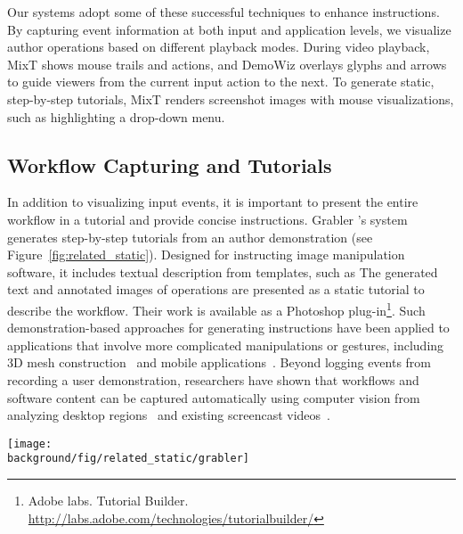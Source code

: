 Our systems adopt some of these successful techniques to enhance instructions. By capturing event information at both input and application levels, we visualize author operations based on different playback modes.
%
During video playback, MixT shows mouse trails and actions, and DemoWiz overlays glyphs and arrows to guide viewers from the current input action to the next.
%
To generate static, step-by-step tutorials, MixT renders screenshot images with mouse visualizations, such as highlighting a drop-down menu.


\subsection{Workflow Capturing and Tutorials}
In addition to visualizing input events, it is important to present the entire workflow in a tutorial and provide concise instructions.
%
Grabler \ea{}'s system~\cite{Grabler:2009jj} generates step-by-step tutorials from an author demonstration (see Figure~\ref{fig:related_static}). Designed for instructing image manipulation software, it includes textual description from templates, such as  The generated text and annotated images of operations are presented as a static tutorial to describe the workflow. Their work is available as a Photoshop plug-in\footnote{Adobe labs. Tutorial Builder. \url{http://labs.adobe.com/technologies/tutorialbuilder/}}.
%
Such demonstration-based approaches for generating instructions have been applied to applications that involve more complicated manipulations or gestures, including 3D mesh construction~\cite{Denning:2011fy} and mobile applications~\cite{Wang:2014:EAC:2556288.2557407}.
%
Beyond logging events from recording a user demonstration, researchers have shown that workflows and software content can be captured automatically using computer vision from analyzing desktop regions~\cite{Yeh:2009dh,Chang:2011vd} and existing screencast videos~\cite{Banovic:2012kd}.

\begin{figure*}[t!]
  \centering
  \texttt{[image: \\background/fig/related\_static/grabler]}
  \caption{Example static tutorial automatically generated by Grabler \ea{}'s system~\cite{Grabler:2009jj}.}
  \label{fig:related_static}
\end{figure*}

